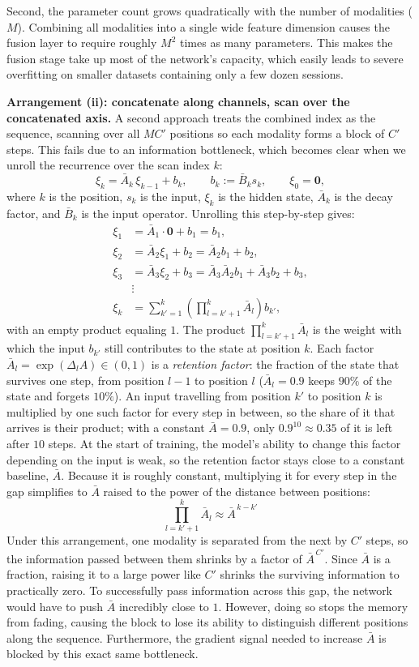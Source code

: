 \documentclass[10pt,a4paper,twocolumn]{article}
\begin{document}
	Second, the parameter count grows quadratically with the number of modalities ($M$). Combining all modalities into a single wide feature dimension causes the fusion layer to require roughly $M^2$ times as many parameters. This makes the fusion stage take up most of the network's capacity, which easily leads to severe overfitting on smaller datasets containing only a few dozen sessions.

	\textbf{Arrangement (ii): concatenate along channels, scan over the concatenated axis.} A second approach treats the combined index as the sequence, scanning over all $MC'$ positions so each modality forms a block of $C'$ steps. This fails due to an information bottleneck, which becomes clear when we unroll the recurrence over the scan index $k$: 
	$$\xi_k = \bar{A}_k\,\xi_{k-1} + b_k, \qquad b_k := \bar{B}_k s_k, \qquad \xi_0 = \mathbf{0},$$ where $k$ is the position, $s_k$ is the input, $\xi_k$ is the hidden state, $\bar{A}_k$ is the decay factor, and $\bar{B}_k$ is the input operator. Unrolling this step-by-step gives:  
	$$\begin{aligned} \xi_1 &= \bar{A}_1 \cdot \mathbf{0} + b_1 = b_1, \\ \xi_2 &= \bar{A}_2 \xi_1 + b_2 = \bar{A}_2 b_1 + b_2, \\ \xi_3 &= \bar{A}_3 \xi_2 + b_3 = \bar{A}_3\bar{A}_2 b_1 + \bar{A}_3 b_2 + b_3, \\ & \vdots \\ \xi_k &= \sum_{k'=1}^{k}\left(\prod_{l=k'+1}^{k}\bar{A}_l\right) b_{k'}, \end{aligned}$$
	with an empty product equaling $1$. The product $\prod_{l=k'+1}^{k}\bar{A}_l$ is the weight with which the input $b_{k'}$ still contributes to the state at position $k$. Each factor $\bar{A}_l = \exp(\Delta_l A) \in (0,1)$ is a \emph{retention factor}: the fraction of the state that survives one step, from position $l-1$ to position $l$ ($\bar{A}_l = 0.9$ keeps $90\%$ of the state and forgets $10\%$). An input travelling from position $k'$ to position $k$ is multiplied by one such factor for every step in between, so the share of it that arrives is their product; with a constant $\bar{A} = 0.9$, only $0.9^{10} \approx 0.35$ of it is left after $10$ steps. At the start of training, the model's ability to change this factor depending on the input is weak, so the retention factor stays close to a constant baseline, $\bar{A}$. Because it is roughly constant, multiplying it for every step in the gap simplifies to $\bar{A}$ raised to the power of the distance between positions:   
	$$\prod_{l=k'+1}^{k}\bar{A}_l \approx \bar{A}^{\,k-k'}$$ Under this arrangement, one modality is separated from the next by $C'$ steps, so the information passed between them shrinks by a factor of $\bar{A}^{\,C'}$. Since $\bar{A}$ is a fraction, raising it to a large power like $C'$ shrinks the surviving information to practically zero. To successfully pass information across this gap, the network would have to push $\bar{A}$ incredibly close to $1$. However, doing so stops the memory from fading, causing the block to lose its ability to distinguish different positions along the sequence. Furthermore, the gradient signal needed to increase $\bar{A}$ is blocked by this exact same bottleneck.
\end{document}
